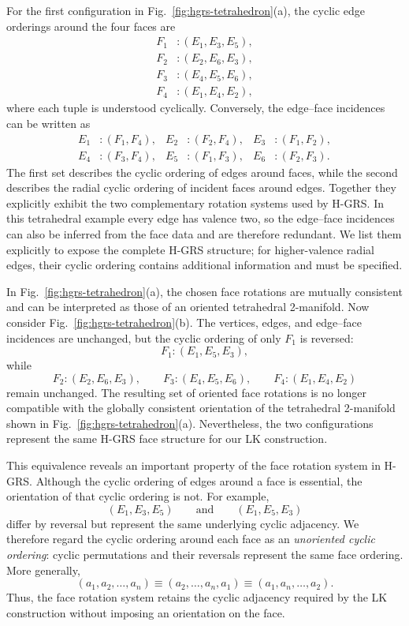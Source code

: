 \documentclass[acmtog]{acmart}
\begin{document}
For the first configuration in Fig.~\ref{fig:hgrs-tetrahedron}(a), the cyclic edge orderings around the four faces are
\[
\begin{aligned}
F_1 &: (E_1,E_3,E_5),\\
F_2 &: (E_2,E_6,E_3),\\
F_3 &: (E_4,E_5,E_6),\\
F_4 &: (E_1,E_4,E_2),
\end{aligned}
\]
where each tuple is understood cyclically. Conversely, the edge--face incidences can be written as
\[
\begin{aligned}
E_1 &: (F_1,F_4),&
E_2 &: (F_2,F_4),&
E_3 &: (F_1,F_2),\\
E_4 &: (F_3,F_4),&
E_5 &: (F_1,F_3),&
E_6 &: (F_2,F_3).
\end{aligned}
\]
The first set describes the cyclic ordering of edges around faces, while the second describes the radial cyclic ordering of incident faces around edges. Together they explicitly exhibit the two complementary rotation systems used by H-GRS. In this tetrahedral example every edge has valence two, so the edge--face incidences can also be inferred from the face data and are therefore redundant. We list them explicitly to expose the complete H-GRS structure; for higher-valence radial edges, their cyclic ordering contains additional information and must be specified.

In Fig.~\ref{fig:hgrs-tetrahedron}(a), the chosen face rotations are mutually consistent and can be interpreted as those of an oriented tetrahedral 2-manifold. Now consider Fig.~\ref{fig:hgrs-tetrahedron}(b). The vertices, edges, and edge--face incidences are unchanged, but the cyclic ordering of only $F_1$ is reversed:
\[
F_1:(E_1,E_5,E_3),
\]
while
\[
F_2:(E_2,E_6,E_3),\qquad
F_3:(E_4,E_5,E_6),\qquad
F_4:(E_1,E_4,E_2)
\]
remain unchanged. The resulting set of oriented face rotations is no longer compatible with the globally consistent orientation of the tetrahedral 2-manifold shown in Fig.~\ref{fig:hgrs-tetrahedron}(a). Nevertheless, the two configurations represent the same H-GRS face structure for our LK construction.

This equivalence reveals an important property of the face rotation system in H-GRS. Although the cyclic ordering of edges around a face is essential, the orientation of that cyclic ordering is not. For example,
\[
(E_1,E_3,E_5)
\qquad\text{and}\qquad
(E_1,E_5,E_3)
\]
differ by reversal but represent the same underlying cyclic adjacency. We therefore regard the cyclic ordering around each face as an \emph{unoriented cyclic ordering}: cyclic permutations and their reversals represent the same face ordering. More generally,
\[
(a_1,a_2,\ldots,a_n)
\equiv
(a_2,\ldots,a_n,a_1)
\equiv
(a_1,a_n,\ldots,a_2).
\]
Thus, the face rotation system retains the cyclic adjacency required by the LK construction without imposing an orientation on the face.
\end{document}
